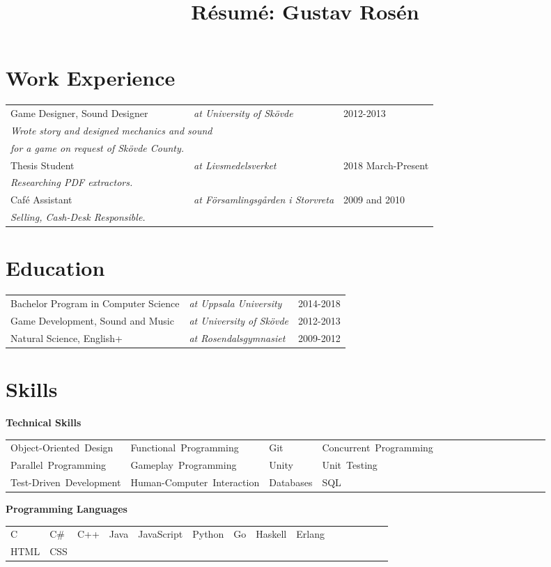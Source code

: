 \documentclass{article}
\title{Résumé: Gustav Rosén}
\author{}
\date{}
\newcommand{\we}[4]{#1 \hspace{1em}& \textit{at #2} & #3 \\ \multicolumn{3}{l}{\indent \textit{#4}}\\ }
\newcommand{\skill}[1]{\mbox{#1\hspace{1.2ex}}}
\newcommand{\cat}[1]{\vspace{2ex}

\noindent \textbf{#1} 

\begin{tabular}{lllllllllllllll}}
\newcommand{\catend}{\end{tabular}}
\newcommand{\program}[4]{#1 & \textit{at #2} & #3-#4 \\}
\renewcommand{\footnote}[1]{}
\begin{document}
\maketitle
\thispagestyle{empty}



\section{Work Experience}
\begin{tabular}{lll}
\we{Game Designer, Sound Designer}{University of Skövde}{2012-2013}{Wrote story and designed mechanics and sound}
\indent \textit{for a game on request of Skövde County.} \\
\we{Thesis Student}{Livsmedelsverket}{2018 March-Present}{Researching PDF extractors.}
\we{Café Assistant}{Församlingsgården i Storvreta}{2009 and 2010}{Selling, Cash-Desk Responsible.}
\end{tabular}

\section{Education}
\begin{tabular}{lll}
\program{Bachelor Program in Computer Science}{Uppsala University}{2014}{2018\footnote{Currently ongoing.}}
\program{Game Development, Sound and Music}{University of Skövde}{2012}{2013}
\program{Natural Science, English+}{Rosendalsgymnasiet}{2009}{2012}
\end{tabular}

\section{Skills}

\cat{Technical Skills}%
\skill{Object-Oriented Design}&
\skill{Functional Programming}&
\skill{Git}&
\skill{Concurrent Programming}\\
\skill{Parallel Programming}&
\skill{Gameplay Programming}&
\skill{Unity}&
\skill{Unit Testing}\\
\skill{Test-Driven Development}&
\skill{Human-Computer Interaction}&
\skill{Databases}&
\skill{SQL}\\
\catend

\cat{Programming Languages}%
\skill{C}&
\skill{C\#}&
\skill{C++}&
\skill{Java}&
\skill{JavaScript}&
\skill{Python}&
\skill{Go}&
\skill{Haskell}&
\skill{Erlang}\\
\skill{HTML}&
\skill{CSS}\\
\catend
\end{document}
